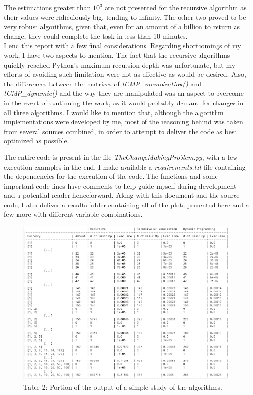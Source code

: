 \documentclass[shortpaper]{revdetua}
\begin{document}
\newpage
The estimations greater than $10^{3}$ are not presented for the recursive 
algorithm as their values were ridiculously big, tending to infinity.
The other two proved to be very robust algorithms, given that, even for an amount
of a billion to return as change, they could complete the task in less than 
10 minutes. \\

I end this report with a few final considerations.
Regarding shortcomings of my work, I have two aspects to mention.
The fact that the recursive algorithms quickly reached Python's maximum 
recursion depth was unfortunate, but my efforts of avoiding such limitation
were not as effective as would be desired.
Also, the differences between the matrices of {\it tCMP\_memoization()\/} and 
{\it tCMP\_dynamic()\/} and the way they are manipulated was an aspect to 
overcome in the event of continuing the work, as it would probably demand for
changes in all three algorithms.
I would like to mention that, although the algorithm implementations were 
developed by me, most of the reasoning behind was taken from several sources 
combined, in order to attempt to deliver the code as best optimized as possible.

The entire code is present in the file {\it TheChangeMakingProblem.py\/},
with a few execution examples in the end.
I make available a {\it requirements.txt\/} file containing the dependencies
for the execution of the code.
The functions and some important code lines have comments to help guide myself
during development and a potential reader henceforward.
Along with this document and the source code, I also deliver a results folder 
containing all of the plots presented here and a few more with different variable
combinations.


\newpage
\begin{figure}[ht]
    \includegraphics[width=\linewidth]{../results/results_table.png}
    \caption{Table 2: Portion of the output of a simple study of the algorithms.}
    \label{tab:2}
\end{figure}
\end{document}
